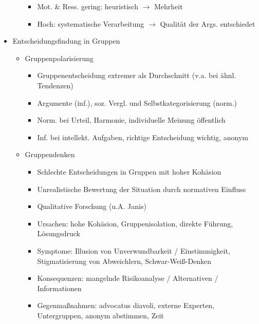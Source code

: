 \documentclass[11pt, paper=a4, twocolumn]{scrartcl}
\begin{document}
\begin{itemize}
\begin{itemize}
\begin{itemize}
							\item Mot. \& Ress. gering: heuristisch $\rightarrow$ Mehrheit
							\item Hoch: systematische Verarbeitung $\rightarrow$ Qualität der Args. entschiedet
						\end{itemize}
				\end{itemize}
			\item Entscheidungsfindung in Gruppen
				\begin{itemize}
					\item Gruppenpolarisierung
						\begin{itemize}
							\item Gruppenentscheidung extremer als Durchschnitt (v.a. bei ähnl. Tendenzen)
							\item Argumente (inf.), soz. Vergl. und Selbstkategorisierung (norm.)
							\item Norm. bei Urteil, Harmonie, individuelle Meinung öffentlich
							\item Inf. bei intellekt. Aufgaben, richtige Entscheidung wichtig, anonym
						\end{itemize}
					\item Gruppendenken
						\begin{itemize}
							\item Schlechte Entscheidungen in Gruppen mit hoher Kohäsion
							\item Unrealistische Bewertung der Situation durch normativen Einfluss
							\item Qualitative Forschung (u.A. Janis)
							\item Ursachen: hohe Kohäsion, Gruppenisolation, direkte Führung, Lösungsdruck
							\item Symptome: Illusion von Unverwundbarkeit / Einstimmigkeit, Stigmatisierung von Abweichlern, 
								Schwar-Weiß-Denken
							\item Konsequenzen: mangelnde Risikoanalyse / Alternativen / Informationen
							\item Gegenmaßnahmen: advocatus diavoli, externe Experten, Untergruppen, anonym abstimmen, Zeit
						\end{itemize}
				\end{itemize}
		\end{itemize}
\end{document}
